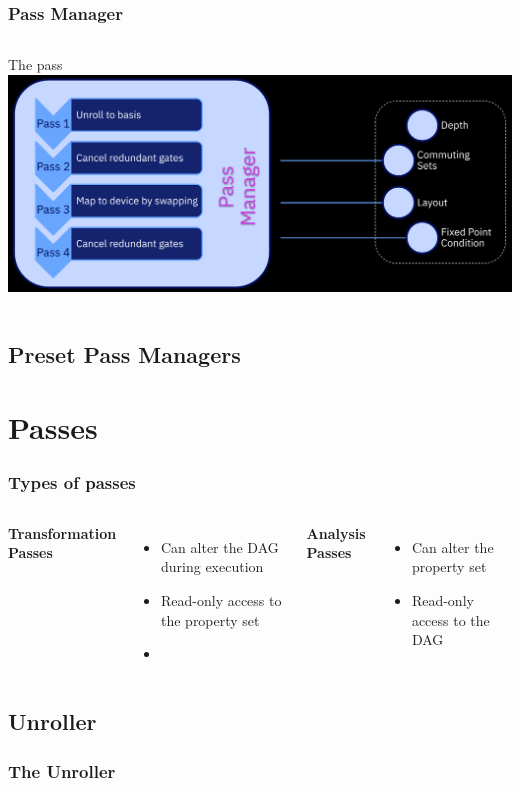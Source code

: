 \documentclass[aspectratio=169,11pt,hyperref={colorlinks=true}]{beamer}
\begin{document}
\begin{frame}
    \frametitle{Pass Manager}
    \begin{columns}
            The pass
            \includegraphics[width=\textwidth]{passmanager.png}
    \end{columns}
\end{frame}
\subsection{Preset Pass Managers}
\section{Passes}
\begin{frame}
    \frametitle{Types of passes}
    \begin{columns}
            \textbf{Transformation Passes} \\
            \begin{itemize}
                \item Can alter the DAG during execution
                \item Read-only access to the property set
                \item
            \end{itemize}
            \textbf{Analysis Passes} \\
            \begin{itemize}
                \item Can alter the property set
                \item Read-only access to the DAG
            \end{itemize}
    \end{columns}
\end{frame}
\subsection{Unroller}
\begin{frame}
    \frametitle{The Unroller}
\end{frame}
\end{document}
